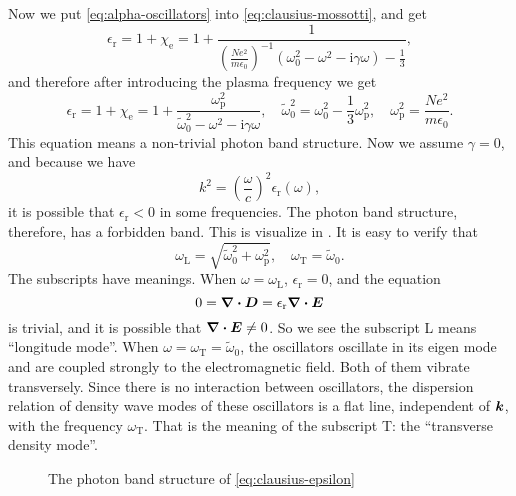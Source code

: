 \documentclass[hyperref, a4paper]{article}
\newcommand*{\ii}{\mathrm{i}}
\begin{document}
Now we put \eqref{eq:alpha-oscillators} into \eqref{eq:clausius-mossotti}, and get 
\[
    \epsilon_\text{r} = 1 + \chi_\text{e} = 1 + \frac{1}{\left(\frac{N e^2}{m \epsilon_0}\right)^{-1} (\omega_0^2 - \omega^2 - \ii \gamma \omega) - \frac{1}{3}}, 
\]
and therefore after introducing the plasma frequency we get 
\begin{equation}
    \epsilon_\text{r} = 1 + \chi_\text{e} = 1 + \frac{\omega_\text{p}^2}{\tilde{\omega}_0^2 - \omega^2 - \ii \gamma \omega}, \quad \tilde{\omega}_0^2 = \omega_0^2 - \frac{1}{3} \omega_\text{p}^2, \quad \omega_\text{p}^2 = \frac{N e^2}{m \epsilon_0}.
    \label{eq:clausius-epsilon}
\end{equation}
This equation means a non-trivial photon band structure. Now we assume $\gamma = 0$, and because we have 
\begin{equation}
    k^2 = \left(\frac{\omega}{c}\right)^2 \epsilon_\text{r}(\omega),
\end{equation}
it is possible that $\epsilon_\text{r} < 0$ in some frequencies. The photon band structure, therefore, has 
a forbidden band. This is visualize in . It is easy to verify that 
\begin{equation}
    \omega_\text{L} = \sqrt{\tilde{\omega}_0^2 + \omega_\text{p}^2}, \quad \omega_\text{T} = \tilde{\omega}_0.
\end{equation}
The subscripts have meanings. When $\omega = \omega_\text{L}$, $\epsilon_\text{r} = 0$, and the equation
\[
    0 = \div{\vb*{D}} = \epsilon_\text{r} \div{\vb*{E}}
\]
is trivial, and it is possible that $\div{\vb*{E}} \neq 0$. So we see the subscript L means ``longitude mode''.
When $\omega = \omega_\text{T} = \tilde{\omega}_0$, the oscillators oscillate in its eigen mode and are coupled 
strongly to the electromagnetic field. Both of them vibrate transversely. Since there is no interaction between 
oscillators, the dispersion relation of density wave modes of these oscillators is a flat line, independent of 
$\vb*{k}$, with the frequency $\omega_\text{T}$. That is the meaning of the subscript T: the ``transverse density mode''.

\begin{figure}
    \centering
    
    \caption{The photon band structure of \eqref{eq:clausius-epsilon}}
    \label{fig:clausius-epsilon}
\end{figure}


 
\end{document}
